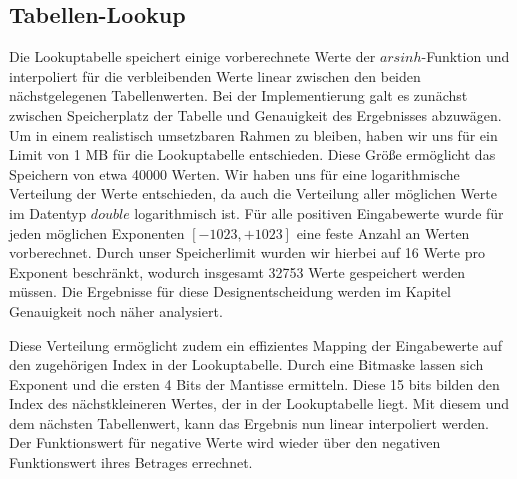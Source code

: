 \documentclass[course=erap] {aspdoc}
\begin{document}
    

    
    \subsection{Tabellen-Lookup}
    Die Lookuptabelle speichert einige vorberechnete Werte der $arsinh$-Funktion und interpoliert für die verbleibenden Werte linear zwischen den beiden nächstgelegenen Tabellenwerten.
    Bei der Implementierung galt es zunächst zwischen Speicherplatz der Tabelle und Genauigkeit des Ergebnisses abzuwägen. Um in einem realistisch umsetzbaren Rahmen zu bleiben, haben wir uns für ein Limit von 1 MB für die Lookuptabelle entschieden. Diese Größe ermöglicht das Speichern von etwa 40000 Werten. Wir haben uns für eine logarithmische Verteilung der Werte entschieden, da auch die Verteilung aller möglichen Werte im Datentyp $double$ logarithmisch ist. Für alle positiven Eingabewerte wurde für jeden möglichen Exponenten $[-1023, +1023]$ eine feste Anzahl an Werten vorberechnet. Durch unser Speicherlimit wurden wir hierbei auf 16 Werte pro Exponent beschränkt, wodurch insgesamt 32753 Werte gespeichert werden müssen. Die Ergebnisse für diese Designentscheidung werden im Kapitel Genauigkeit noch näher analysiert.
    
    Diese Verteilung ermöglicht zudem ein effizientes Mapping der Eingabewerte auf den zugehörigen Index in der Lookuptabelle. Durch eine Bitmaske lassen sich Exponent und die ersten 4 Bits der Mantisse ermitteln. Diese 15 bits bilden den Index des nächstkleineren Wertes, der in der Lookuptabelle liegt. Mit diesem und dem nächsten Tabellenwert, kann das Ergebnis nun linear interpoliert werden. Der Funktionswert für negative Werte wird wieder über den negativen Funktionswert ihres Betrages errechnet.
    
\end{document}

